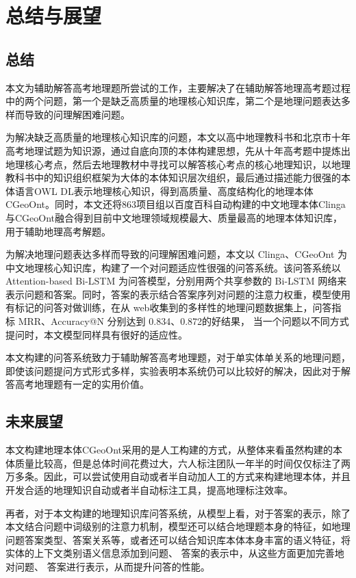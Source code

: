\chapter{总结与展望}
\section{总结}
本文为辅助解答高考地理题所尝试的工作，主要解决了在辅助解答地理高考题过程中的两个问题，第一个是缺乏高质量的地理核心知识库，第二个是地理问题表达多样而导致的问理解困难问题。

为解决缺乏高质量的地理核心知识库的问题，本文以高中地理教科书和北京市十年高考地理试题为知识源，通过自底向顶的本体构建思想，先从十年高考题中提炼出地理核心考点，然后去地理教材中寻找可以解答核心考点的核心地理知识，以地理教科书中的知识组织框架为大体的本体知识层次组织，最后通过描述能力很强的本体语言OWL DL表示地理核心知识，得到高质量、高度结构化的地理本体CGeoOnt。同时，本文还将863项目组以百度百科自动构建的中文地理本体Clinga与CGeoOnt融合得到目前中文地理领域规模最大、质量最高的地理本体知识库，用于辅助地理高考解题。

为解决地理问题表达多样而导致的问理解困难问题，本文以 Clinga、CGeoOnt 为中文地理核心知识库，构建了一个对问题适应性很强的问答系统。该问答系统以 Attention-based Bi-LSTM 为问答模型，分别用两个共享参数的 Bi-LSTM 网络来表示问题和答案。同时，答案的表示结合答案序列对问题的注意力权重，模型使用有标记的问答对做训练，在从 web收集到的多样性的地理问题数据集上，问答指标 MRR、Accuracy@N 分别达到 0.834、0.872的好结果， 当一个问题以不同方式提问时，本文模型同样具有很好的适应性。

本文构建的问答系统致力于辅助解答高考地理题，对于单实体单关系的地理问题，即使该问题提问方式形式多样，实验表明本系统仍可以比较好的解决，因此对于解答高考地理题有一定的实用价值。

\section{未来展望}
本文构建地理本体CGeoOnt采用的是人工构建的方式，从整体来看虽然构建的本体质量比较高，但是总体时间花费过大，六人标注团队一年半的时间仅仅标注了两万多条。因此，可以尝试使用自动或者半自动加人工的方式来构建地理本体，并且开发合适的地理知识自动或者半自动标注工具，提高地理标注效率。

再者，对于本文构建的地理知识库问答系统，从模型上看，对于答案的表示，除了本文结合问题中词级别的注意力机制，模型还可以结合地理题本身的特征，如地理问题答案类型、答案关系等，或者还可以结合知识库本体本身丰富的语义特征，将实体的上下文类别语义信息添加到问题、 答案的表示中，从这些方面更加完善地对问题、 答案进行表示，从而提升问答的性能。

